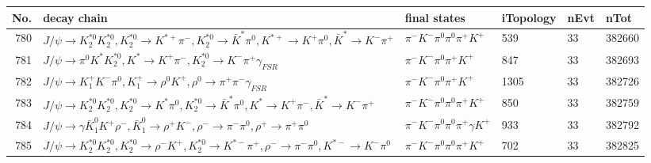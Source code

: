 \begin{table}[htbp] 
\begin{center}
\begin{small}
\begin{tabular}{rlllll}\hline\hline
 No. & decay chain & final states &  iTopology & nEvt & nTot \\\hline
780&$J/\psi       \rightarrow K_2^{*0}       K_2^{*0}       , K_2^{*0}        \rightarrow K^{*+}         \pi^{-}        , K_2^{*0}        \rightarrow \bar{K}^{*}   \pi^{0}        , K^{*+}          \rightarrow K^{+}          \pi^{0}        , \bar{K}^{*}    \rightarrow K^{-}          \pi^{+}        $&$\pi^{-}        K^{-}          \pi^{0}        \pi^{0}        \pi^{+}        K^{+}          $&  539&   33&382660\\
781&$J/\psi       \rightarrow \pi^{0}        K^{*}          K_2^{*0}       , K^{*}           \rightarrow K^{+}          \pi^{-}        , K_2^{*0}        \rightarrow K^{-}          \pi^{+}        \gamma_{FSR} $&$\pi^{-}        K^{-}          \pi^{0}        \pi^{+}        K^{+}          $&  847&   33&382693\\
782&$J/\psi       \rightarrow K_1^{+}        K^{-}          \pi^{0}        , K_1^{+}         \rightarrow \rho^{0}      K^{+}          , \rho^{0}       \rightarrow \pi^{+}        \pi^{-}        \gamma_{FSR} $&$\pi^{-}        K^{-}          \pi^{0}        \pi^{+}        K^{+}          $& 1305&   33&382726\\
783&$J/\psi       \rightarrow K_2^{*0}       K_2^{*0}       , K_2^{*0}        \rightarrow K^{*}          \pi^{0}        , K_2^{*0}        \rightarrow \bar{K}^{*}   \pi^{0}        , K^{*}           \rightarrow K^{+}          \pi^{-}        , \bar{K}^{*}    \rightarrow K^{-}          \pi^{+}        $&$\pi^{-}        K^{-}          \pi^{0}        \pi^{0}        \pi^{+}        K^{+}          $&  850&   33&382759\\
784&$J/\psi       \rightarrow \gamma       \bar{K}_1^{0} K^{+}          \rho^{-}      , \bar{K}_1^{0}  \rightarrow \rho^{+}      K^{-}          , \rho^{-}       \rightarrow \pi^{-}        \pi^{0}        , \rho^{+}       \rightarrow \pi^{+}        \pi^{0}        $&$\pi^{-}        K^{-}          \pi^{0}        \pi^{0}        \pi^{+}        \gamma       K^{+}          $&  933&   33&382792\\
785&$J/\psi       \rightarrow K_2^{*0}       K_2^{*0}       , K_2^{*0}        \rightarrow \rho^{-}      K^{+}          , K_2^{*0}        \rightarrow K^{*-}         \pi^{+}        , \rho^{-}       \rightarrow \pi^{-}        \pi^{0}        , K^{*-}          \rightarrow K^{-}          \pi^{0}        $&$\pi^{-}        K^{-}          \pi^{0}        \pi^{0}        \pi^{+}        K^{+}          $&  702&   33&382825\\

\end{tabular}
\end{small}
\end{center}
\end{table}
